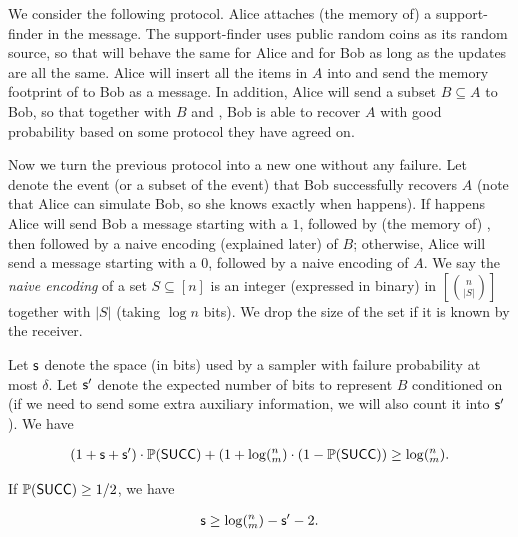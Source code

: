 We consider the following protocol. Alice attaches (the memory of) a support-finder \samp in the message. The support-finder uses public random coins as its random source, so that \samp will behave the same for Alice and for Bob as long as the updates are all the same. Alice will insert all the items in $A$ into \samp and send the memory footprint of \samp to Bob as a message. In addition, Alice will send a subset $B\subseteq A$ to Bob, so that together with $B$ and \samp, Bob is able to recover $A$ with good probability based on some protocol they have agreed on. 
 
Now we turn the previous protocol into a new one without any failure. Let \success denote the event (or a subset of the event) that Bob successfully recovers $A$ (note that Alice can simulate Bob, so she knows exactly when \success happens). If \success happens Alice will send Bob a message starting with a $1$, followed by (the memory of) \samp, then followed by a naive encoding (explained later) of $B$; otherwise, Alice will send a message starting with a $0$, followed by a naive encoding of $A$. We say the {\em naive encoding} of a set $S\subseteq [n]$ is an integer (expressed in binary) in $[{n \choose |S|}]$ together with $|S|$ (taking $\log n$ bits). We drop the size of the set if it is known by the receiver.

\begin{lemma} \label{lemma:lb-meta}
  Let $\textsf{s}$ denote the space (in bits) used by a sampler with failure probability at most $\delta$. Let $\textsf{s}'$ denote the expected number of bits to represent $B$ conditioned on \success (if we need to send some extra auxiliary information, we will also count it into $\textsf{s}'$). We have 
  
  \begin{align}
  (1+\textsf{s}+\textsf{s}')\cdot \operatorname*{\mathbb{P}}(\textsf{SUCC})+(1+\log(^n_m) \cdot (1-\operatorname*{\mathbb{P}}(\textsf{SUCC})) \ge \log (^n_m).
  \end{align} 
  
  If $\operatorname*{\mathbb{P}}(\textsf{SUCC})\ge 1/2$, we have 
  
  \begin{align} \label{eqn:lb-meta}
  \textsf{s}\ge \log (^n_m) - \textsf{s}' - 2.
  \end{align} 
\end{lemma}


